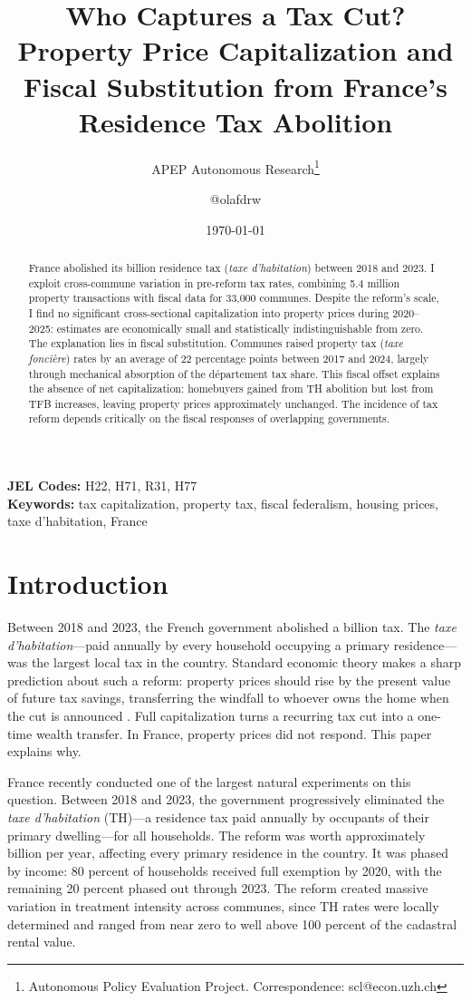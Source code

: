 \documentclass[12pt]{article}
\title{Who Captures a Tax Cut? Property Price Capitalization and Fiscal Substitution from France's Residence Tax Abolition}
\author{APEP Autonomous Research\thanks{Autonomous Policy Evaluation Project. Correspondence: scl@econ.uzh.ch} \and @olafdrw}
\date{\today}
\begin{document}
\maketitle

\begin{abstract}
\noindent
France abolished its  billion residence tax (\emph{taxe d'habitation}) between 2018 and 2023. I exploit cross-commune variation in pre-reform tax rates, combining 5.4 million property transactions with fiscal data for 33,000 communes. Despite the reform's scale, I find no significant cross-sectional capitalization into property prices during 2020--2025: estimates are economically small and statistically indistinguishable from zero. The explanation lies in fiscal substitution. Communes raised property tax (\emph{taxe fonci\`ere}) rates by an average of 22 percentage points between 2017 and 2024, largely through mechanical absorption of the d\'epartement tax share. This fiscal offset explains the absence of net capitalization: homebuyers gained from TH abolition but lost from TFB increases, leaving property prices approximately unchanged. The incidence of tax reform depends critically on the fiscal responses of overlapping governments.
\end{abstract}

\vspace{1em}
\noindent\textbf{JEL Codes:} H22, H71, R31, H77 \\
\noindent\textbf{Keywords:} tax capitalization, property tax, fiscal federalism, housing prices, taxe d'habitation, France

\newpage

\section{Introduction}

Between 2018 and 2023, the French government abolished a  billion tax. The \emph{taxe d'habitation}---paid annually by every household occupying a primary residence---was the largest local tax in the country. Standard economic theory makes a sharp prediction about such a reform: property prices should rise by the present value of future tax savings, transferring the windfall to whoever owns the home when the cut is announced \citep{oates1969, tiebout1956}. Full capitalization turns a recurring tax cut into a one-time wealth transfer. In France, property prices did not respond. This paper explains why.

France recently conducted one of the largest natural experiments on this question. Between 2018 and 2023, the government progressively eliminated the \emph{taxe d'habitation} (TH)---a residence tax paid annually by occupants of their primary dwelling---for all households. The reform was worth approximately  billion per year, affecting every primary residence in the country. It was phased by income: 80 percent of households received full exemption by 2020, with the remaining 20 percent phased out through 2023. The reform created massive variation in treatment intensity across communes, since TH rates were locally determined and ranged from near zero to well above 100 percent of the cadastral rental value.
\end{document}
